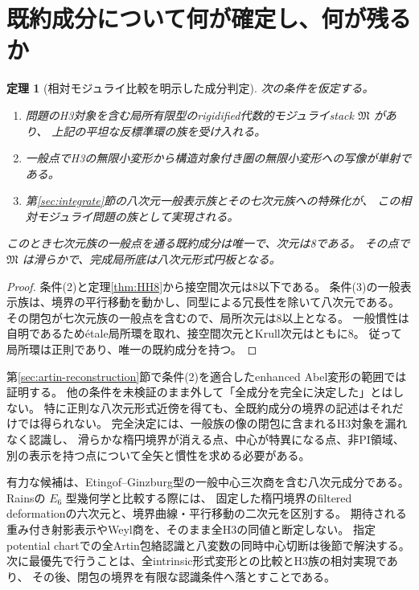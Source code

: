 \documentclass[11pt,a4paper]{ltjsarticle}
\newtheorem{theorem}{定理}[section]
\theoremstyle{definition}\newtheorem{definition}[theorem]{定義}
\theoremstyle{remark}\newtheorem{remark}[theorem]{注意}
\begin{document}
\section{既約成分について何が確定し、何が残るか}\label{sec:component}
\begin{theorem}[相対モジュライ比較を明示した成分判定]\label{thm:conditional-component}
次の条件を仮定する。
\begin{enumerate}
\item 問題のH3対象を含む局所有限型のrigidified代数的モジュライstack $\mathfrak M$ があり、
上記の平坦な反標準環の族を受け入れる。
\item 一般点でH3の無限小変形から構造対象付き圏の無限小変形への写像が単射である。
\item 第\ref{sec:integrate}節の八次元一般表示族とその七次元族への特殊化が、
この相対モジュライ問題の族として実現される。
\end{enumerate}
このとき七次元族の一般点を通る既約成分は唯一で、次元は8である。
その点で $\mathfrak M$ は滑らかで、完成局所底は八次元形式円板となる。
\end{theorem}
\begin{proof}
条件(2)と定理\ref{thm:HH8}から接空間次元は8以下である。
条件(3)の一般表示族は、境界の平行移動を動かし、同型による冗長性を除いて八次元である。
その閉包が七次元族の一般点を含むので、局所次元は8以上となる。
一般慣性は自明であるため\'{e}tale局所環を取れ、接空間次元とKrull次元はともに8。
従って局所環は正則であり、唯一の既約成分を持つ。
\end{proof}

第\ref{sec:artin-reconstruction}節で条件(2)を適合したenhanced Abel変形の範囲では証明する。
他の条件を未検証のまま外して「全成分を完全に決定した」とはしない。
特に正則な八次元形式近傍を得ても、全既約成分の境界の記述はそれだけでは得られない。
完全決定には、一般族の像の閉包に含まれるH3対象を漏れなく認識し、
滑らかな楕円境界が消える点、中心が特異になる点、非PI領域、
別の表示を持つ点について全矢と慣性を求める必要がある。

有力な候補は、Etingof--Ginzburg型の一般中心三次商を含む八次元成分である。
Rainsの $E_6$ 型幾何学と比較する際には、
固定した楕円境界のfiltered deformationの六次元と、境界曲線・平行移動の二次元を区別する。
期待される重み付き射影表示やWeyl商を、そのまま全H3の同値と断定しない。
指定potential chartでの全Artin包絡認識と八変数の同時中心切断は後節で解決する。
次に最優先で行うことは、全intrinsic形式変形との比較とH3族の相対実現であり、
その後、閉包の境界を有限な認識条件へ落とすことである。







\end{document}
